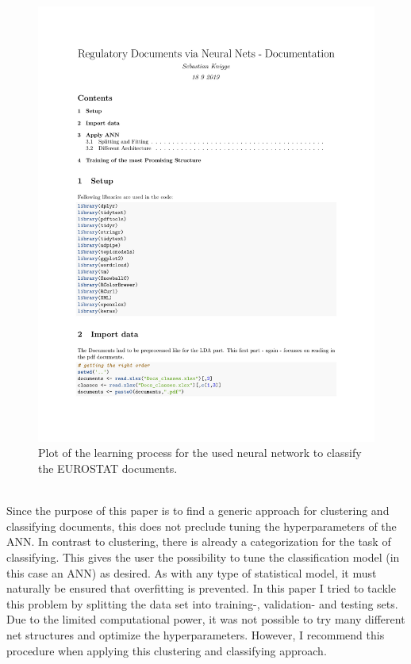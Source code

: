\documentclass[11pt,a4paper]{article}
\begin{document}
\begin{figure}[!htbp]
	\includegraphics[page=9, trim=68 400 10 80,clip,width=1\textwidth]{ANN_RegDocs.pdf}
	\caption{Plot of the learning process for the used neural network to classify the EUROSTAT documents.}
	\label{learning:plot}
\end{figure}
\ \\
Since the purpose of this paper is to find a generic approach for clustering and classifying documents, this does not preclude tuning the hyperparameters of the ANN. In contrast to clustering, there is already a categorization for the task of classifying. This gives the user the possibility to tune the classification model (in this case an ANN) as desired. As with any type of statistical model, it must naturally be ensured that overfitting is prevented. In this paper I tried to tackle this problem by splitting the data set into training-, validation- and testing sets. Due to the limited computational power, it was not possible to try many different net structures and optimize the hyperparameters. However, I recommend this procedure when applying this clustering and classifying approach.
\end{document}
